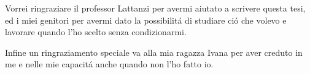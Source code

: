\documentclass[a4paper,singleside,11pt]{report}
\begin{document}

\copertinatesi 
{}
\indice
\indicefigure
\iniziatesto







\appendix
%


\ringraziamentiS
Vorrei ringraziare il professor Lattanzi per avermi aiutato a scrivere questa tesi, ed i miei genitori per avermi dato la possibilit\'a di studiare ci\'o che volevo e lavorare quando l'ho scelto senza condizionarmi.

Infine un ringraziamento speciale va alla mia ragazza Ivana per aver creduto in me e nelle mie capacit\'a anche quando non l'ho fatto io.
\end{document}

